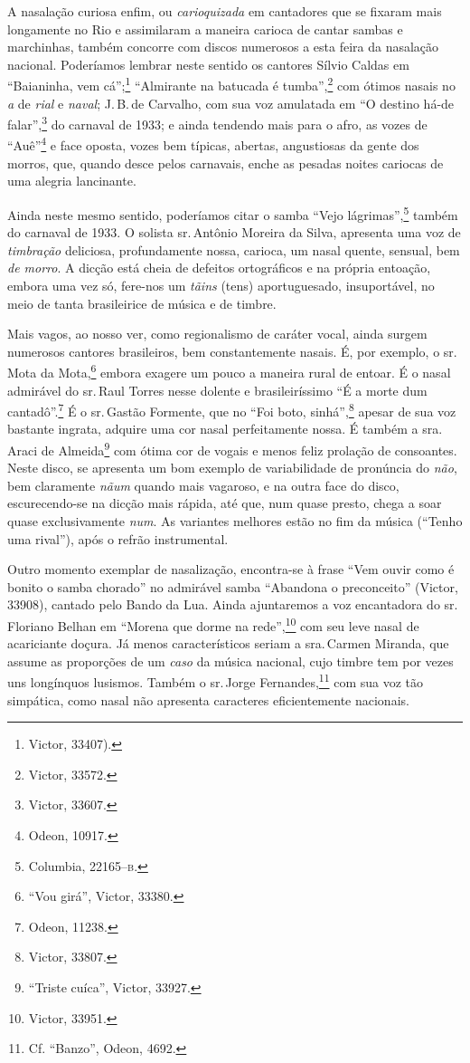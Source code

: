 A nasalação curiosa enfim, ou \textit{carioquizada} em cantadores que se fixaram
mais longamente no Rio e assimilaram a maneira carioca de cantar sambas
e marchinhas, também concorre com discos numerosos a esta feira da
nasalação nacional. Poderíamos lembrar neste sentido os cantores Sílvio
Caldas em ``Baianinha, vem cá'';\footnote{Victor, 33407).} ``Almirante na batucada é
tumba'',\footnote{Victor, 33572.} com ótimos nasais no \textit{a} de \textit{rial} e \textit{naval};
J.\,B.\,de Carvalho, com sua voz amulatada em ``O destino há-de falar'',\footnote{Victor, 33607.} do carnaval de 1933; e ainda tendendo mais para o afro,
as vozes de ``Auê''\footnote{Odeon, 10917.} e face oposta, vozes bem típicas,
abertas, angustiosas da gente dos morros, que, quando desce pelos
carnavais, enche as pesadas noites cariocas de uma alegria lancinante.

Ainda neste mesmo sentido, poderíamos citar o samba ``Vejo lágrimas'',\footnote{Columbia, 22165--\textsc{b}.} também do carnaval de 1933. O solista sr.\,Antônio
Moreira da Silva, apresenta uma voz de \textit{timbração} deliciosa,
profundamente nossa, carioca, um nasal quente, sensual, bem \textit{de
morro}. A dicção está cheia de defeitos ortográficos e na própria
entoação, embora uma vez só, fere-nos um \textit{tãins} (tens) aportuguesado,
insuportável, no meio de tanta brasileirice de música e de timbre.

Mais vagos, ao nosso ver, como regionalismo de caráter vocal, ainda
surgem numerosos cantores brasileiros, bem constantemente nasais. É, por
exemplo, o sr.\,Mota da Mota,\footnote{``Vou girá'', Victor, 33380.} embora exagere um
pouco a maneira rural de entoar. É o nasal admirável do sr.\,Raul Torres
nesse dolente e brasileiríssimo ``É a morte dum cantadô''.\footnote{Odeon, 11238.} É
o sr.\,Gastão Formente, que no ``Foi boto, sinhá'',\footnote{Victor, 33807.} apesar de
sua voz bastante ingrata, adquire uma cor nasal perfeitamente nossa. É
também a sra.\,Araci de Almeida\footnote{``Triste cuíca'', Victor, 33927.} com ótima
cor de vogais e menos feliz prolação de consoantes. Neste disco, se
apresenta um bom exemplo de variabilidade de pronúncia do \textit{não}, bem
claramente \textit{nãum} quando mais vagaroso, e na outra face do disco,
escurecendo-se na dicção mais rápida, até que, num quase presto, chega a
soar quase exclusivamente \textit{num}. As variantes melhores estão no fim da
música (``Tenho uma rival''), após o refrão instrumental.

Outro momento exemplar de nasalização, encontra-se à frase ``Vem ouvir
como é bonito o samba chorado'' no admirável samba ``Abandona o
preconceito'' (Victor, 33908), cantado pelo Bando da Lua. Ainda
ajuntaremos a voz encantadora do sr.\,Floriano Belhan em ``Morena que dorme
na rede'',\footnote{Victor, 33951.} com seu leve nasal de acariciante doçura. Já
menos característicos seriam a sra.\,Carmen Miranda, que assume as
proporções de um \textit{caso} da música nacional, cujo timbre tem por vezes
uns longínquos lusismos. Também o sr.\,Jorge Fernandes,\footnote{Cf. ``Banzo'',
Odeon, 4692.} com sua voz tão simpática, como nasal não apresenta
caracteres eficientemente nacionais.

